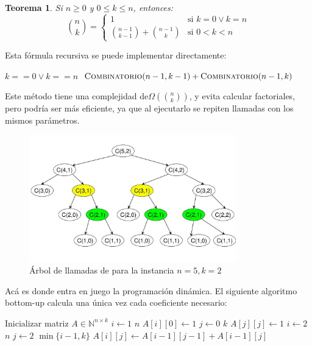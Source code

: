 \documentclass[a4paper]{report}
\newcommand{\BigOmega}[1]{\ensuremath{\Omega(#1)}}
\newcommand{\si}{\text{si }}
\newcommand{\N}{\mathbb{N}}
\newtheorem*{theorem*}{Teorema}
\begin{document}
\begin{theorem*}
    Si $n \geq 0$ y $0 \leq k \leq n$, entonces:
    $$
        \binom{n}{k} =
        \begin{cases}
            1                                       & \si k = 0 \lor k = n \\
            \binom{n - 1}{k - 1} + \binom{n - 1}{k} & \si 0 < k < n
        \end{cases}
    $$
\end{theorem*}

Esta fórmula recursiva se puede implementar directamente:
\begin{codebox}
    \li \If $k == 0 \lor k == n$ \Then
    \li {}
    \li \Else
    \li \Return $\textnormal{\scshape Combinatorio}(n-1,k-1) + \textnormal{\scshape Combinatorio}(n-1,k)$
    \End
\end{codebox}

Este método tiene una complejidad de\BigOmega{\binom{n}{k}}, y evita calcular factoriales, pero podría ser más eficiente, ya que al ejecutarlo se repiten llamadas con los mismos parámetros.
\begin{figure}[H]
    \centering
    \includegraphics[width=0.8\textwidth]{combinatorio_call_tree.jpg}
    \caption*{Árbol de llamadas de  para la instancia $n=5, k=2$}
\end{figure}

Acá es donde entra en juego la programación dinámica. El siguiente algoritmo bottom-up calcula una única vez cada coeficiente necesario:
\begin{codebox}
    \li Inicializar matriz $A \in \N^{n \times k}$
    \li \For $i \gets 1$ \To $n$ \Do
    \li $A[i][0] \gets 1$
    \End
    \li \For $j \gets 0$ \To $k$ \Do
    \li $A[j][j] \gets 1$
    \End
    \li \For $i \gets 2$ \To $n$ \Do
    \li \For $j \gets 2$ \To $\min{\{i - 1, k\}}$ \Do
    \li $A[i][j] \gets A[i - 1][j - 1] + A[i - 1][j]$
    \End
    \End
\end{codebox}
\end{document}
